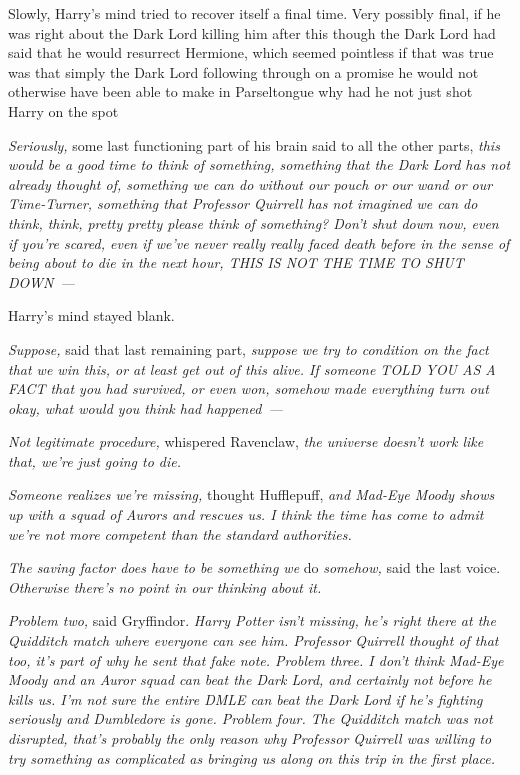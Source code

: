 Slowly, Harry's mind tried to recover itself a final time. Very possibly final,
if he was right about the Dark Lord killing him after this{\el} though the
Dark Lord had said that he would resurrect Hermione, which seemed pointless if
that was true{\el} was that simply the Dark Lord following through on a
promise he would not otherwise have been able to make in Parseltongue{\el}
why had he not just shot Harry on the spot{\el}

\emph{Seriously,} some last functioning part of his brain said to all the other
parts, \emph{this would be a good time to think of something, something that
the Dark Lord has not already thought of, something we can do without our pouch
or our wand or our Time-Turner, something that Professor Quirrell has not
imagined we can do{\el} think, think, pretty pretty please think of
something? Don't shut down now, even if you're scared, even if we've never
really really faced death before in the sense of being about to die in the next
hour, THIS IS NOT THE TIME TO SHUT DOWN~--- }

Harry's mind stayed blank.

\emph{Suppose,} said that last remaining part, \emph{suppose we try to
condition on the fact that we win this, or at least get out of this alive. If
someone TOLD YOU AS A FACT that you had survived, or even won, somehow made
everything turn out okay, what would you think had happened~--- }

\emph{Not legitimate procedure,} whispered Ravenclaw, \emph{the universe
doesn't work like that, we're just going to die.}

\emph{Someone realizes we're missing,} thought Hufflepuff, \emph{and Mad-Eye
Moody shows up with a squad of Aurors and rescues us. I think the time has come
to admit we're not more competent than the standard authorities.}

\emph{The saving factor does have to be something we} do \emph{somehow,} said
the last voice. \emph{Otherwise there's no point in our thinking about it.}

\emph{Problem two,} said Gryffindor. \emph{Harry Potter isn't missing, he's
right there at the Quidditch match where everyone can see him. Professor
Quirrell thought of that too, it's part of why he sent that fake note. Problem
three. I don't think Mad-Eye Moody and an Auror squad can beat the Dark Lord,
and certainly not before he kills us. I'm not sure the entire DMLE can beat the
Dark Lord if he's fighting seriously and Dumbledore is gone. Problem four. The
Quidditch match was not disrupted, that's probably the only reason why
Professor Quirrell was willing to try something as complicated as bringing us
along on this trip in the first place.}

